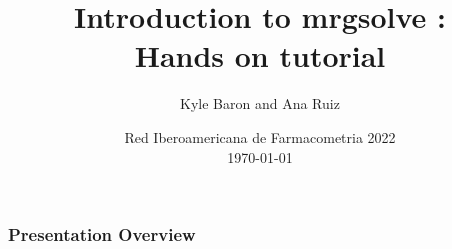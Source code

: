 \documentclass[
	11pt, %
]{beamer}
\title[RedIF 2022]{Introduction to mrgsolve :  \\Hands on tutorial} %
\author[Kyle Baron \and Ana Ruiz]{Kyle Baron and Ana Ruiz} %
\institute{Metrum Research Group and Gilead Sciences} %
\date[\today]{Red Iberoamericana de Farmacometria 2022 \\ \today} %
\begin{document}

\begin{frame}
	\titlepage %



\end{frame}






\begin{frame}
	\frametitle{Presentation Overview} %
	
	\tableofcontents %
\end{frame}
\end{document}
